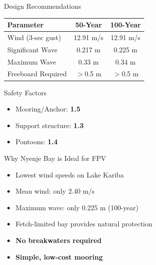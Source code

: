 \documentclass[10pt]{beamer}
\begin{document}
\begin{frame}{Design Recommendations}
\begin{table}
\centering
\begin{tabular}{lcc}
\hline
\textbf{Parameter} & \textbf{50-Year} & \textbf{100-Year} \\
\hline
Wind (3-sec gust) & 12.91 m/s & 12.91 m/s \\
Significant Wave & 0.217 m & 0.225 m \\
Maximum Wave & 0.33 m & 0.34 m \\
Freeboard Required & $>$0.5 m & $>$0.5 m \\
\hline
\end{tabular}
\end{table}

\begin{block}{Safety Factors}
\begin{itemize}
    \item Mooring/Anchor: \textbf{1.5}
    \item Support structure: \textbf{1.3}
    \item Pontoons: \textbf{1.4}
\end{itemize}
\end{block}
\end{frame}

\begin{frame}{Why Nyenje Bay is Ideal for FPV}
\begin{center}
\Large {}
\end{center}

\begin{itemize}
    \item Lowest wind speeds on Lake Kariba
    \item Mean wind: only 2.40 m/s
    \item Maximum wave: only 0.225 m (100-year)
    \item Fetch-limited bay provides natural protection
    \item \textbf{No breakwaters required}
    \item \textbf{Simple, low-cost mooring}
\end{itemize}

\begin{center}
\Large {}
\end{center}
\end{frame}
\end{document}
